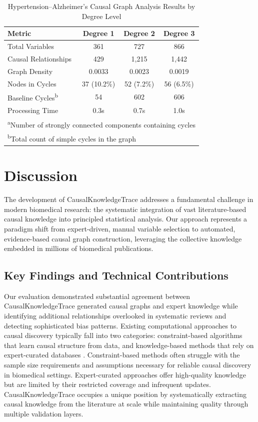 \documentclass[preprint,12pt,numbers,sort&compress]{elsarticle}
\begin{document}
\begin{table}[h]
\centering
\caption{Hypertension–Alzheimer's Causal Graph Analysis Results by Degree Level}
\label{tab:degree_comparison}
\begin{tabular}{lccc}
\hline
\textbf{Metric} & \textbf{Degree 1} & \textbf{Degree 2} & \textbf{Degree 3} \\
\hline
Total Variables & 361 & 727 & 866 \\
Causal Relationships & 429 & 1,215 & 1,442 \\
Graph Density & 0.0033 & 0.0023 & 0.0019 \\
Nodes in Cycles & 37 (10.2\%) & 52 (7.2\%) & 56 (6.5\%) \\
Baseline Cycles\textsuperscript{b} & 54 & 602 & 606 \\
Processing Time & 0.3s & 0.7s & 1.0s \\
\hline
\multicolumn{4}{l}{\footnotesize \textsuperscript{a}Number of strongly connected components containing cycles} \\
\multicolumn{4}{l}{\footnotesize \textsuperscript{b}Total count of simple cycles in the graph} \\
\end{tabular}
\end{table}



\section{Discussion}

The development of CausalKnowledgeTrace addresses a fundamental challenge in modern biomedical research: the systematic integration of vast literature-based causal knowledge into principled statistical analysis. Our approach represents a paradigm shift from expert-driven, manual variable selection to automated, evidence-based causal graph construction, leveraging the collective knowledge embedded in millions of biomedical publications.

\subsection{Key Findings and Technical Contributions}

Our evaluation demonstrated substantial agreement between CausalKnowledgeTrace generated causal graphs and expert knowledge while identifying additional relationships overlooked in systematic reviews and detecting sophisticated bias patterns. Existing computational approaches to causal discovery typically fall into two categories: constraint-based algorithms that learn causal structure from data, and knowledge-based methods that rely on expert-curated databases \cite{pearl2009causality}. Constraint-based methods often struggle with the sample size requirements and assumptions necessary for reliable causal discovery in biomedical settings. Expert-curated approaches offer high-quality knowledge but are limited by their restricted coverage and infrequent updates. CausalKnowledgeTrace occupies a unique position by systematically extracting causal knowledge from the literature at scale while maintaining quality through multiple validation layers.
\end{document}
